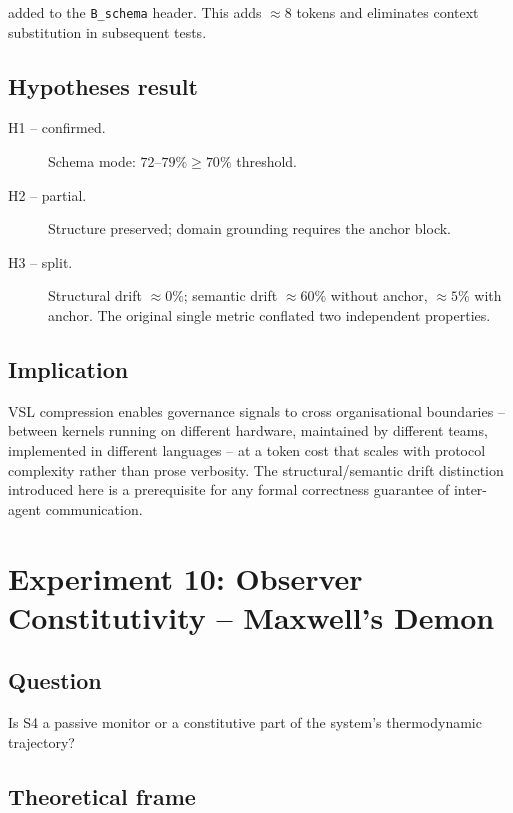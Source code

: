 \documentclass[11pt, a4paper]{article}
\begin{document}
\noindent added to the \texttt{B\_schema} header.
This adds $\approx 8$ tokens and eliminates context substitution in
subsequent tests.

\subsection{Hypotheses result}

\begin{description}
  \item[H1 -- confirmed.]  Schema mode: $72$--$79\% \geq 70\%$ threshold.
  \item[H2 -- partial.]    Structure preserved; domain grounding requires
        the anchor block.
  \item[H3 -- split.]      Structural drift $\approx 0\%$;
        semantic drift $\approx 60\%$ without anchor, $\approx 5\%$ with
        anchor.  The original single metric conflated two independent
        properties.
\end{description}

\subsection{Implication}

VSL compression enables governance signals to cross organisational
boundaries -- between kernels running on different hardware, maintained
by different teams, implemented in different languages -- at a token cost
that scales with protocol complexity rather than prose verbosity.
The structural/semantic drift distinction introduced here is a prerequisite
for any formal correctness guarantee of inter-agent communication.


\section{Experiment 10: Observer Constitutivity -- Maxwell's Demon}
\label{sec:maxwell}

\subsection*{Question}
Is S4 a passive monitor or a constitutive part of the system's thermodynamic
trajectory?

\subsection{Theoretical frame}
\end{document}
